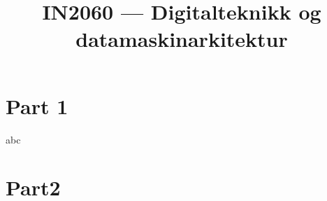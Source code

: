 \documentclass{article}
\title{IN2060 --- Digitalteknikk og datamaskinarkitektur}
\author{}
\begin{document}
	\maketitle
	\section*{Part 1}
		abc

	\section*{Part2}
\end{document}
